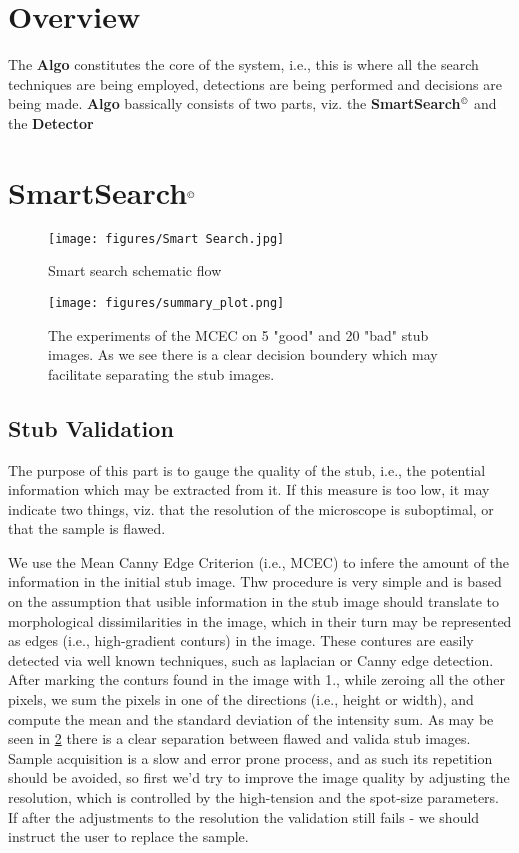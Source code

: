 \section{Overview}
The \textbf{Algo} constitutes the core of the system, i.e., this is where all the search techniques are being employed, detections are being performed and decisions are being made. \textbf{Algo} bassically consists of two parts, viz. the \textbf{SmartSearch$^\copyright$} and the \textbf{Detector}

\section{SmartSearch$^\copyright$}
\begin{figure}
    \centering
    \texttt{[image: figures/Smart Search.jpg]}
    \caption{Smart search schematic flow}
    \label{fig:smart_search}
\end{figure}

\begin{figure}
    \centering
    \texttt{[image: figures/summary\_plot.png]}
    \caption{The experiments of the MCEC on 5 "good" and 20 "bad" stub images. As we see there is a clear decision boundery which may facilitate separating the stub images.}
    \label{fig:mcec_sep_creterion}
\end{figure}

\subsection{Stub Validation}
The purpose of this part is to gauge the quality of the stub, i.e., the potential information which may be extracted from it. If this measure is too low, it may indicate two things, viz. that the resolution of the microscope is suboptimal, or that the sample is flawed.

We use the Mean Canny Edge Criterion (i.e., MCEC) to infere the amount of the information in the initial stub image. Thw procedure is very simple and is based on the assumption that usible information in the stub image should translate to morphological dissimilarities in the image, which in their turn may be represented as edges (i.e., high-gradient conturs) in the image. These contures are easily detected via well known techniques, such as laplacian or Canny edge detection. After marking the conturs found in the image with 1., while zeroing all the other pixels, we sum the pixels in one of the directions (i.e., height or width), and compute the mean and the standard deviation of the intensity sum. As may be seen in \ref{fig:mcec_sep_creterion} there is a clear separation between flawed and valida stub images. Sample acquisition is a slow and error prone process, and as such its repetition should be avoided, so first we’d try to improve the image quality by adjusting the resolution, which is controlled by the high-tension and the spot-size parameters. If after the adjustments to the resolution the validation still fails - we should instruct the user to replace the sample.

